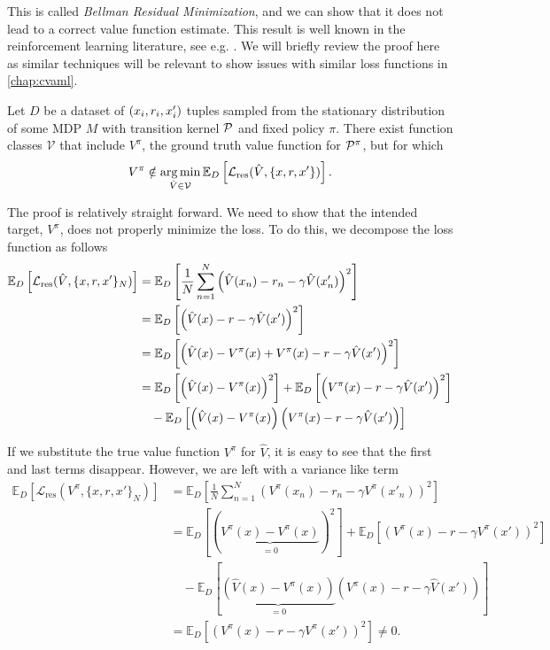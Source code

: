 This is called \emph{Bellman Residual Minimization}, and we can show that it does not lead to a correct value function estimate.
This result is well known in the reinforcement learning literature, see e.g. \textcite[p. 299]{suttonbook}.
We will briefly review the proof here as similar techniques will be relevant to show issues with similar loss functions in \autoref{chap:cvaml}.


\begin{proposition}
    Let $D$ be a dataset of $(\state_i,r_i,\state'_i)$ tuples sampled from the stationary distribution of some MDP $M$ with transition kernel $\P$ and fixed policy $\pi$.
    There exist function classes $\mathcal{V}$ that include $V^\pi$, the ground truth value function for $\P^\pi$, but for which 
    \[V^\pi \notin \argmin_{\hat{V} \in \mathcal{V}} \mathbb{E}_{D} \left[\mathcal{L}_\mathrm{res}(\hat{V}, \{\state, r, \state'\})\right].\]
\end{proposition}

The proof is relatively straight forward.
We need to show that the intended target, $V^\pi$, does not properly minimize the loss.
To do this, we decompose the loss function as follows
\begin{align}
    \mathbb{E}_{D} \left[\mathcal{L}_\mathrm{res}(\hat{V}, \{\state, r, \state'\}_N)\right] &= \mathbb{E}_{D} \left[\frac{1}{N} \sum_{n=1}^N \left(\hat{V}(\state_n) - r_n - \gamma \hat{V}(\state'_n)\right)^2\right] \\
    &=\mathbb{E}_{D} \left[\left(\hat{V}(x) - r - \gamma \hat{V}(x')\right)^2\right] \\
    &=\mathbb{E}_{D} \left[\left(\hat{V}(x) - V^\pi(x) + V^\pi(x) - r - \gamma \hat{V}(x')\right)^2\right] \\
    &=\mathbb{E}_{D} \left[\left(\hat{V}(x) - V^\pi(x)\right)^2\right] + \mathbb{E}_{D}\left[\left( V^\pi(x) - r - \gamma \hat{V}(x')\right)^2\right] \\
    &\quad - \mathbb{E}_{D}\left[\left(\hat{V}(x) - V^\pi(x)\right)\left( V^\pi(x) - r - \gamma \hat{V}(x')\right)\right]
\end{align}

If we substitute the true value function $V^\pi$ for $\hat{V}$, it is easy to see that the first and last terms disappear.
However, we are left with a variance like term
\begin{align}
    \mathbb{E}_{D} \left[\mathcal{L}_\mathrm{res}(V^\pi, \{x, r, x'\}_N)\right] &= \mathbb{E}_{D} \left[\frac{1}{N} \sum_{n=1}^N \left(V^\pi(x_n) - r_n - \gamma V^\pi(x'_n)\right)^2\right] \\
    &=\mathbb{E}_{D} \left[\left(\underbrace{V^\pi(x) - V^\pi(x)}_{=0}\right)^2\right] + \mathbb{E}_{D}\left[\left( V^\pi(x) - r - \gamma V^\pi(x')\right)^2\right] \\
    &\quad - \mathbb{E}_{D}\left[\underbrace{\left(\hat{V}(x) - V^\pi(x)\right)}_{=0}\left( V^\pi(x) - r - \gamma \hat{V}(x')\right)\right]\\
    &=\mathbb{E}_{D}\left[\left( V^\pi(x) - r - \gamma V^\pi(x')\right)^2\right] \neq 0.
\end{align}

